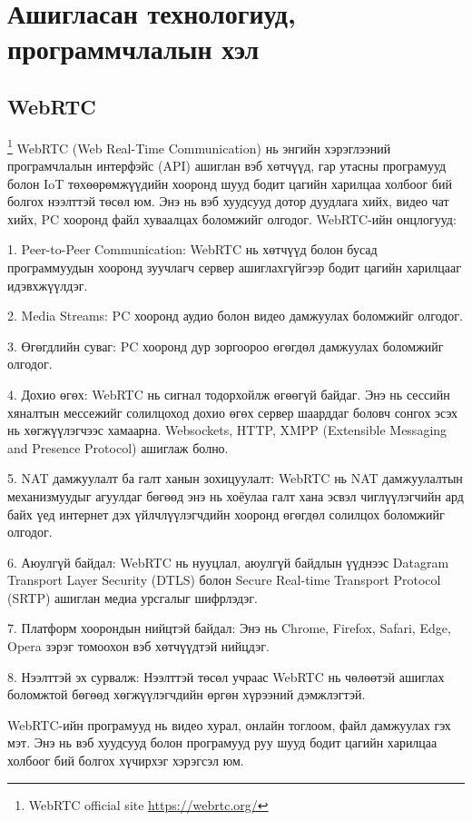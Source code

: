 \section{Ашигласан технологиуд, программчлалын хэл}
\subsection{WebRTC}
\footnote{WebRTC official site \url{https://webrtc.org/}}
	\quad \quad WebRTC (Web Real-Time Communication) нь энгийн хэрэглээний програмчлалын интерфэйс (API) ашиглан вэб хөтчүүд, гар утасны програмууд болон IoT төхөөрөмжүүдийн хооронд шууд бодит цагийн харилцаа холбоог бий болгох нээлттэй төсөл юм. Энэ нь вэб хуудсууд дотор дуудлага хийх, видео чат хийх, PC хооронд файл хуваалцах боломжийг олгодог. WebRTC-ийн онцлогууд:

	1. Peer-to-Peer Communication: WebRTC нь хөтчүүд болон бусад программуудын хооронд зуучлагч сервер ашиглахгүйгээр бодит цагийн харилцааг идэвхжүүлдэг.
	
	2. Media Streams: PC хооронд аудио болон видео дамжуулах боломжийг олгодог.
	
	3. Өгөгдлийн суваг: PC хооронд дур зоргоороо өгөгдөл дамжуулах боломжийг олгодог.
	
	4. Дохио өгөх: WebRTC нь сигнал тодорхойлж өгөөгүй байдаг. Энэ нь сессийн хяналтын мессежийг солилцоход дохио өгөх сервер шаарддаг боловч сонгох  эсэх нь хөгжүүлэгчээс хамаарна. Websockets, HTTP, XMPP (Extensible Messaging and Presence Protocol) ашиглаж болно.
	
	5. NAT дамжуулалт ба галт ханын зохицуулалт: WebRTC нь NAT дамжуулалтын механизмуудыг агуулдаг бөгөөд энэ нь хоёулаа галт хана эсвэл чиглүүлэгчийн ард байх үед интернет дэх үйлчлүүлэгчдийн хооронд өгөгдөл солилцох боломжийг олгодог.
	
	6. Аюулгүй байдал: WebRTC нь нууцлал, аюулгүй байдлын үүднээс Datagram Transport Layer Security (DTLS) болон Secure Real-time Transport Protocol (SRTP) ашиглан медиа урсгалыг шифрлэдэг.
	
	7. Платформ хоорондын нийцтэй байдал: Энэ нь Chrome, Firefox, Safari, Edge, Opera зэрэг томоохон вэб хөтчүүдтэй нийцдэг.
	
	8. Нээлттэй эх сурвалж: Нээлттэй төсөл учраас WebRTC нь чөлөөтэй ашиглах боломжтой бөгөөд хөгжүүлэгчдийн өргөн хүрээний дэмжлэгтэй.
	
	WebRTC-ийн програмууд нь видео хурал, онлайн тоглоом, файл дамжуулах гэх мэт. Энэ нь вэб хуудсууд болон програмууд руу шууд бодит цагийн харилцаа холбоог бий болгох хүчирхэг хэрэгсэл юм.
	\pagebreak
